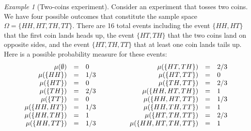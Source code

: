 \documentclass{article}
\theoremstyle{remark}
\newtheorem{example}{Example}\newtheorem{definition}{Definition}\newtheorem{thm}{Theorem}
\newcommand{\pmeas}{\ensuremath{\mu}}
\begin{document}
\noindent \begin{example}[Two-coins experiment]\label{ex1} Consider
an experiment that tosses two coins. We have four possible outcomes
that constitute the sample space $\Omega=\{HH,HT,TH,TT\}$. There
are 16 total events including the event $\{HH,HT\}$ that the first
coin lands heads up, the event $\{HT,TH\}$ that the two coins land
on opposite sides, and the event $\{HT,TH,TT\}$ that at least one
coin lands tails up. Here is a possible probability measure for these
events: 
\[
\begin{array}{c@{\qquad\qquad}c}
\begin{array}{rcl}
\pmeas(\emptyset) & = & 0\\
\pmeas(\{HH\}) & = & 1/3\\
\pmeas(\{HT\}) & = & 0\\
\pmeas(\{TH\}) & = & 2/3\\
\pmeas(\{TT\}) & = & 0\\
\pmeas(\{HH,HT\}) & = & 1/3\\
\pmeas(\{HH,TH\}) & = & 1\\
\pmeas(\{HH,TT\}) & = & 1/3
\end{array} & \begin{array}{rcl}
\pmeas(\{HT,TH\}) & = & 2/3\\
\pmeas(\{HT,TT\}) & = & 0\\
\pmeas(\{TH,TT\}) & = & 2/3\\
\pmeas(\{HH,HT,TH\}) & = & 1\\
\pmeas(\{HH,HT,TT\}) & = & 1/3\\
\pmeas(\{HH,TH,TT\}) & = & 1\\
\pmeas(\{HT,TH,TT\}) & = & 2/3\\
\pmeas(\{HH,HT,TH,TT\}) & = & 1
\end{array}\end{array}
\]
\end{example}
\end{document}
